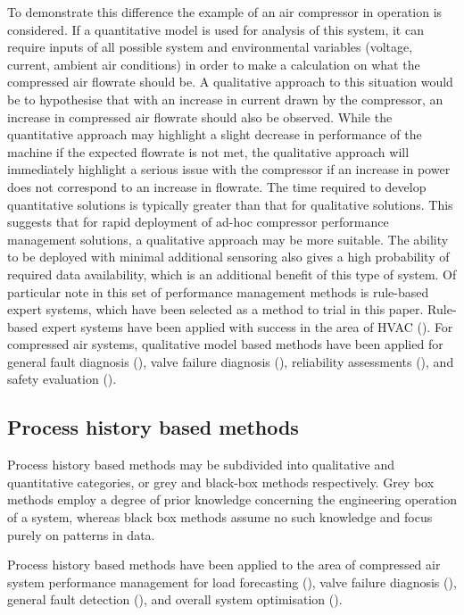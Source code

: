 To demonstrate this difference the example of an air compressor in operation is considered. If a quantitative model is used for analysis of this system, it can require inputs of all possible system and environmental variables (voltage, current, ambient air conditions) in order to make a calculation on what the compressed air flowrate should be. A qualitative approach to this situation would be to hypothesise that with an increase in current drawn by the compressor, an increase in compressed air flowrate should also be observed. While the quantitative approach may highlight a slight decrease in performance of the machine if the expected flowrate is not met, the qualitative approach will immediately highlight a serious issue with the compressor if an increase in power does not correspond to an increase in flowrate. The time required to develop quantitative solutions is typically greater than that for qualitative solutions. This suggests that for rapid deployment of ad-hoc compressor performance management solutions, a qualitative approach may be more suitable. The ability to be deployed with minimal additional sensoring also gives a high probability of required data availability, which is an additional benefit of this type of system. Of particular note in this set of performance management methods is rule-based expert systems, which have been selected as a method to trial in this paper. Rule-based expert systems have been applied with success in the area of HVAC (\cite{Bruton2014a}). For compressed air systems, qualitative model based methods have been applied for general fault diagnosis (\cite{Liu2001}), valve failure diagnosis (\cite{RuilinLin2010}), reliability assessments (\cite{Ren2012}), and safety evaluation (\cite{Zhu2013}).

\subsection{Process history based methods}
Process history based methods may be subdivided into qualitative and quantitative categories, or grey and black-box methods respectively. Grey box methods employ a degree of prior knowledge concerning the engineering operation of a system, whereas black box methods assume no such knowledge and focus purely on patterns in data.

Process history based methods have been applied to the area of compressed air system performance management for load forecasting (\cite{Liu2013}), valve failure diagnosis (\cite{Wang2010}), general fault detection (\cite{Petkovic2012}), and overall system optimisation (\cite{Kopanos2015}).

